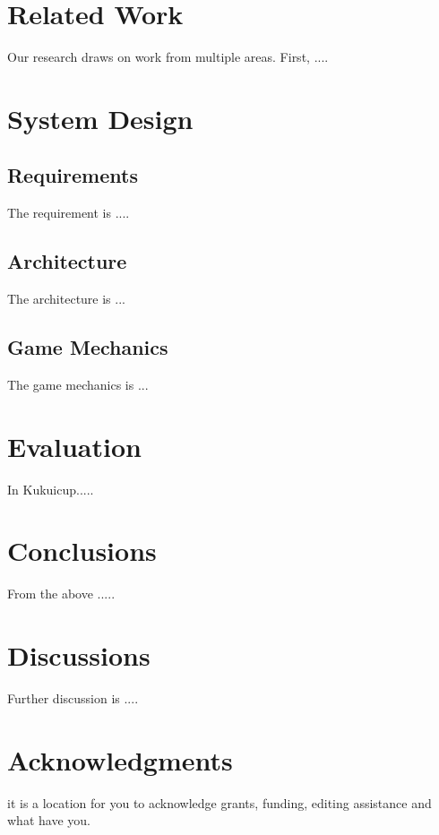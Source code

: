 \documentclass{acm_proc_article-sp}
\begin{document}
\section{Related Work}
Our research draws on work from multiple areas. First, .... \cite{brewer2011kukui}

\section{System Design}

\subsection{Requirements}
The requirement is ....

\subsection{Architecture}
The architecture is ...

\subsection{Game Mechanics}
The game mechanics is ...

\section{Evaluation}
In Kukuicup.....

\section{Conclusions}
From the above .....

\section{Discussions}
Further discussion is ....

\section{Acknowledgments}
it is a location for you to acknowledge grants, funding, editing assistance and
what have you.  
%

  
%
%
\balancecolumns
\end{document}
